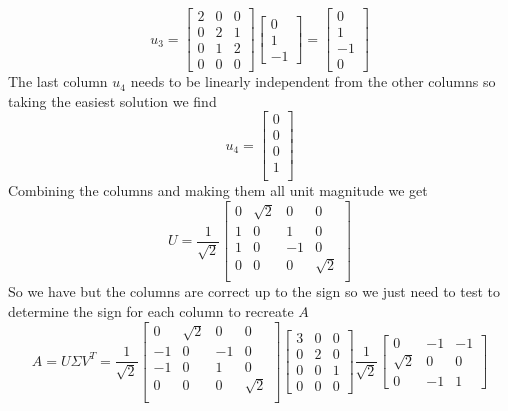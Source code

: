 \documentclass{article}
\begin{document}
$$u_3 =
\begin{bmatrix}
2 & 0 & 0 \\
0 & 2 & 1 \\
0 & 1 & 2 \\
0 & 0 & 0
\end{bmatrix}
\begin{bmatrix}
0 \\
1 \\
-1
\end{bmatrix}
=
\begin{bmatrix}
0 \\
1 \\
-1 \\
0
\end{bmatrix}
$$
The last column $u_4$ needs to be linearly independent from the other columns so taking the easiest solution we find
$$u_4 =
\begin{bmatrix}
0 \\
0 \\
0 \\
1 \\
\end{bmatrix}
$$
Combining the columns and making them all unit magnitude we get
$$ U =
\frac{1}{\sqrt{2}}
\begin{bmatrix}
0 & \sqrt{2} & 0 & 0 \\
1 & 0 & 1 & 0 \\
1 & 0 & -1 & 0 \\
0 & 0 & 0 & \sqrt{2} \\
\end{bmatrix}
$$
So we have but the columns are correct up to the sign so we just need to test to determine the sign for each column to recreate $A$
$$
A = U\Sigma V^T =
\frac{1}{\sqrt{2}}
\begin{bmatrix}
0 & \sqrt{2} & 0 & 0\\
-1 & 0 & -1 & 0\\
-1 & 0 & 1 & 0\\
0 & 0 & 0 & \sqrt{2}\\
\end{bmatrix}
\begin{bmatrix}
3 & 0 & 0 \\
0 & 2 & 0 \\
0 & 0 & 1 \\
0 & 0 & 0
\end{bmatrix}
\frac{1}{\sqrt{2}}
\begin{bmatrix}
0 & -1 & -1 \\
\sqrt{2} & 0 & 0 \\
0 & -1 & 1
\end{bmatrix}
$$
\end{document}
